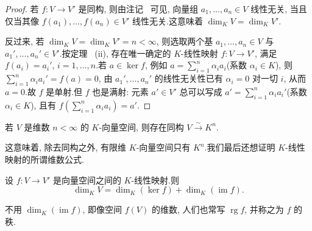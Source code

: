 \begin{proof}
若 $f \colon V \longrightarrow V'$ 是同构, 则由注记~ 可见, 向量组 $a_1, \ldots, a_n \in V$ 线性无关, 当且仅当其像 $f(a_1), \ldots, f(a_n) \in V'$ 线性无关.这意味着 $\dim_K V = \dim_K V'$.

反过来, 若 $\dim_K V = \dim_K V' = n < \infty$, 则选取两个基 $a_1, \ldots, a_n \in V$ 与 $a_1', \ldots, a_n' \in V'$.按定理~ (ii), 存在唯一确定的 $K$-线性映射 $f \colon V \longrightarrow V'$, 满足 $f(a_i) = a_i'$, $i = 1, \ldots, n$.若 $a \in \ker f$, 例如 $a = \sum_{i = 1}^{n} \alpha_i a_i$(系数 $\alpha_i \in K$), 则 $\sum_{i = 1}^{n} \alpha_i a_i' = f(a) = 0$, 由 $a_1', \ldots, a_n'$ 的线性无关性已有 $\alpha_i = 0$ 对一切 $i$, 从而 $a = 0$.故 $f$ 是单射.但 $f$ 也是满射: 元素 $a' \in V'$ 总可以写成 $a' = \sum_{i = 1}^{n} \alpha_i a_i'$(系数 $\alpha_i \in K$), 且有 $f\left(\sum_{i = 1}^{n} \alpha_i a_i\right) = a'$.
\end{proof}

\begin{corollary}\label{cor:2.1.9}
若 $V$ 是维数 $n < \infty$ 的 $K$-向量空间, 则存在同构 $V \overset{\sim}{\longrightarrow} K^n$.
\end{corollary}

这意味着, 除去同构之外, 有限维 $K$-向量空间只有 $K^n$.我们最后还想证明 $K$-线性映射的所谓维数公式.

\begin{theorem}[维数公式]\label{thm:2.1.10}
设 $f \colon V \longrightarrow V'$ 是向量空间之间的 $K$-线性映射.则
\[
\dim_K V = \dim_K(\ker f) + \dim_K(\operatorname{im} f)\text{.}
\]
\end{theorem}

不用 $\dim_K(\operatorname{im} f)$, 即像空间 $f(V)$ 的维数, 人们也常写 $\operatorname{rg} f$, 并称之为 $f$ 的秩.

